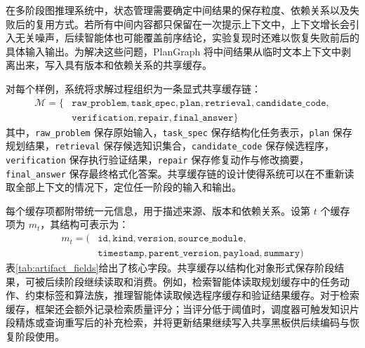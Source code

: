 在多阶段图推理系统中，状态管理需要确定中间结果的保存粒度、依赖关系以及失败后的复用方式。若所有中间内容都只保留在一次提示上下文中，上下文增长会引入无关噪声，后续智能体也可能覆盖前序结论，实验复现时还难以恢复失败前后的具体输入输出。为解决这些问题，PlanGraph 将中间结果从临时文本上下文中剥离出来，写入具有版本和依赖关系的共享缓存。

对每个样例，系统将求解过程组织为一条显式共享缓存链：
\begin{equation}
\begin{aligned}
\mathcal{M}=\{&\texttt{raw\_problem},\texttt{task\_spec},\texttt{plan},\texttt{retrieval},\texttt{candidate\_code},\\
              &\texttt{verification},\texttt{repair},\texttt{final\_answer}\}
\end{aligned}
\end{equation}
其中，\texttt{raw\_problem} 保存原始输入，\texttt{task\_spec} 保存结构化任务表示，\texttt{plan} 保存规划结果，\texttt{retrieval} 保存候选知识集合，\texttt{candidate\_code} 保存候选程序，\texttt{verification} 保存执行验证结果，\texttt{repair} 保存修复动作与修改摘要，\texttt{final\_answer} 保存最终格式化答案。共享缓存链的设计使得系统可以在不重新读取全部上下文的情况下，定位任一阶段的输入和输出。

每个缓存项都附带统一元信息，用于描述来源、版本和依赖关系。设第 $t$ 个缓存项为 $m_t$，其结构可表示为：
\begin{equation}
\begin{aligned}
m_t=(&\texttt{id},\texttt{kind},\texttt{version},\texttt{source\_module},\\
     &\texttt{timestamp},\texttt{parent\_version},\texttt{payload},\texttt{summary})
\end{aligned}
\end{equation}
表\ref{tab:artifact_fields}给出了核心字段。共享缓存以结构化对象形式保存阶段结果，可被后续阶段继续读取和消费。例如，检索智能体读取规划缓存中的任务动作、约束标签和算法族，推理智能体读取候选程序缓存和验证结果缓存。对于检索缓存，框架还会额外记录检索质量评分；当评分低于阈值时，调度器可触发知识片段精炼或查询重写后的补充检索，并将更新结果继续写入共享黑板供后续编码与恢复阶段使用。

